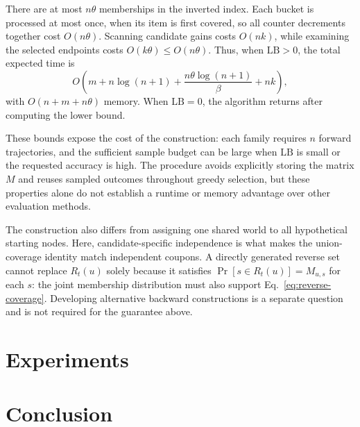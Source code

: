 \documentclass[sigconf]{acmart}
\begin{document}
There are at most $n\theta$ memberships in the inverted index.
Each bucket is processed at most once, when its item is first
covered, so all counter decrements together cost $O(n\theta)$.
Scanning candidate gains costs $O(nk)$, while examining the
selected endpoints costs $O(k\theta)\le O(n\theta)$.
Thus, when $\mathrm{LB}>0$, the total expected time is
\begin{equation}
\label{eq:total-complexity}
 O\left(m+n\log(n+1)+\frac{n\theta\log(n+1)}{\beta}+nk\right),
\end{equation}
with $O(n+m+n\theta)$ memory. When $\mathrm{LB}=0$, the algorithm
returns after computing the lower bound.

These bounds expose the cost of the construction: each family
requires $n$ forward trajectories, and the sufficient sample
budget can be large when $\mathrm{LB}$ is small or the requested
accuracy is high. The procedure avoids explicitly storing the
matrix $M$ and reuses sampled outcomes throughout greedy selection,
but these properties alone do not establish a runtime or memory
advantage over other evaluation methods.

The construction also differs from assigning one shared world
to all hypothetical starting nodes. Here, candidate-specific
independence is what makes the union-coverage identity match
independent coupons. A directly generated reverse set cannot
replace $R_t(u)$ solely because it satisfies
$\Pr[s\in R_t(u)]=M_{u,s}$ for each $s$: the joint membership
distribution must also support Eq.~\eqref{eq:reverse-coverage}.
Developing alternative backward constructions is a separate
question and is not required for the guarantee above.



\section{Experiments}
\label{sec:exp}


\section{Conclusion}
\label{sec:conclusion}

\end{document}
